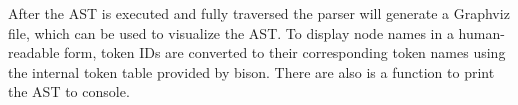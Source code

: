 
After the AST is executed and fully traversed the parser will generate a
Graphviz file, which can be used to visualize the AST. To display node names 
in a human-readable form, token IDs are converted to their corresponding
token names using the internal token table provided by bison.
There are also is a function to print the AST to console.